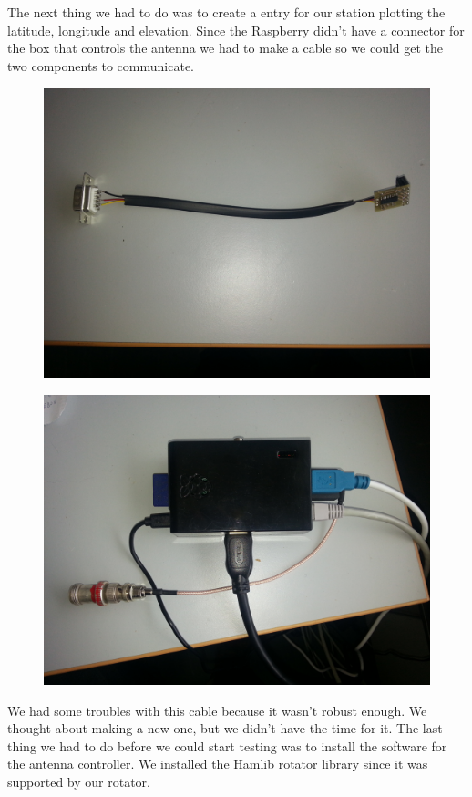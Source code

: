 The next thing we had to do was to create a entry for our station plotting the latitude, longitude and elevation.    
Since the Raspberry didn’t have a connector for the box that controls the antenna we had to make a cable so we could get the two components to communicate.
\begin{figure}
\centering
\includegraphics[width=\textwidth]{Figures/rasp-2}
\label{fig: Control cable}
\end{figure}
\begin{figure}
\centering
\includegraphics[width=\textwidth]{Figures/rasp-1}
\label{fig: Raspberry Pi with antenna connected}
\end{figure}
We had some troubles with this cable because it wasn't robust enough. We thought about making a new one, but we didn't have the time for it. 
The last thing we had to do before we could start testing was to install the software for the antenna controller. We installed the Hamlib rotator library since it was supported by our rotator. 

